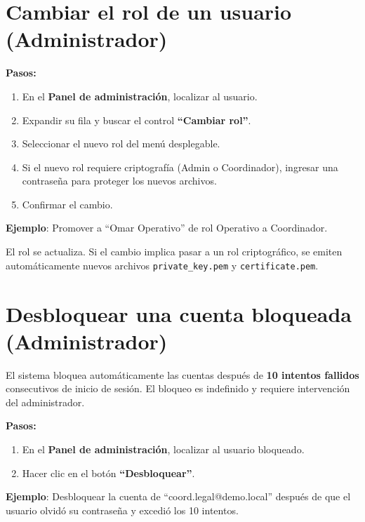 \documentclass[10pt,letterpaper]{report}
\begin{document}
\section{Cambiar el rol de un usuario (Administrador)}

\textbf{Pasos:}
\begin{enumerate}[leftmargin=2cm]
  \item En el \textbf{Panel de administración}, localizar al usuario.
  \item Expandir su fila y buscar el control \textbf{``Cambiar rol''}.
  \item Seleccionar el nuevo rol del menú desplegable.
  \item Si el nuevo rol requiere criptografía (Admin o Coordinador), ingresar una contraseña para proteger los nuevos archivos.
  \item Confirmar el cambio.
\end{enumerate}

\textbf{Ejemplo}: Promover a ``Omar Operativo'' de rol Operativo a Coordinador.

\begin{successbox}
  El rol se actualiza. Si el cambio implica pasar a un rol criptográfico, se emiten automáticamente nuevos archivos \texttt{private\_key.pem} y \texttt{certificate.pem}.
\end{successbox}

\section{Desbloquear una cuenta bloqueada (Administrador)}

El sistema bloquea automáticamente las cuentas después de \textbf{10 intentos fallidos} consecutivos de inicio de sesión. El bloqueo es indefinido y requiere intervención del administrador.

\textbf{Pasos:}
\begin{enumerate}[leftmargin=2cm]
  \item En el \textbf{Panel de administración}, localizar al usuario bloqueado.
  \item Hacer clic en el botón \textbf{``Desbloquear''}.
\end{enumerate}

\textbf{Ejemplo}: Desbloquear la cuenta de ``coord.legal@demo.local'' después de que el usuario olvidó su contraseña y excedió los 10 intentos.
\end{document}
